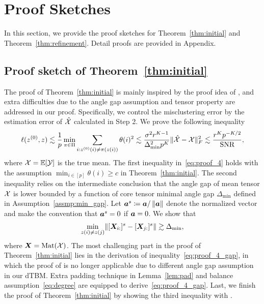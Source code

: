 \documentclass[lettersize,onecolumn,journal]{IEEEtran}
\theoremstyle{definition}
\theoremstyle{definition}
\begin{document}



{
\color{blue}

\section{Proof Sketches}

In this section, we provide the proof sketches for Theorem~\ref{thm:initial} and Theorem~\ref{thm:refinement}. Detail proofs are provided in Appendix.


\subsection{Proof sketch of Theorem~\ref{thm:initial}}
The proof of Theorem~\ref{thm:initial} is mainly inspired by the proof idea of \citet[Lemma 1]{gao2018community}, and extra difficulties due to the angle gap assumption and tensor property are addressed in our proof. Specifically, we control the misclustering error by the estimation error of $\hat {\mathcal{X}}$ calculated in Step 2.  We prove the following inequality
\begin{equation}\label{eq:proof_4}
    \ell(z^{(0)},z) \lesssim \frac{1}{p}\min_{\pi \in \Pi} \sum_{i: z^{(0)}(i) \neq \pi(z(i))} \theta(i)^2 \lesssim \frac{\sigma^2 r^{K-1}}{ \Delta_{\min}^2 p^K} \onormSize{}{\hat \tX - \tX}_F^2 \lesssim \frac{r^K p^{-K/2}}{\text{SNR}},
\end{equation}
where $\mathcal{X} = \mathbb{E}[\mathcal{Y}]$ is the true mean. The first inequality in~\eqref{eq:proof_4} holds with the assumption $\min_{i \in [p]} \theta(i) \geq c$ in Theorem~\ref{thm:initial}. The second inequality relies on the intermediate conclusion that the angle gap of mean tensor $\mathcal{X}$ is lower bounded by a function of core tensor minimal angle gap $\Delta_{\min}$ defined in Assumption~\ref{assmp:min_gap}. Let $\bm{a}^{s} \coloneqq \bm{a}/\left\lVert\bm{a}\right\rVert$ denote the normalized vector and make the convention that $\bm{a}^s = 0$ if $\bm{a} = 0$. We show that
\begin{equation}\label{eq:proof_4_gap}
\min_{z(i) \neq z(j)} \onormSize{}{[\mX_{i:}]^s - [\mX_{j:}]^s} \gtrsim \Delta_{\min},
\end{equation}
where $\bm X = \text{Mat}(\mathcal{X})$. The most challenging part in the proof of Theorem~\ref{thm:initial} lies in the derivation of inequality~\eqref{eq:proof_4_gap}, in which the proof of \cite{gao2018community} is no longer applicable due to different angle gap assumption in our dTBM. Extra padding technique in Lemma~\ref{lem:pad} and balance assumption~\eqref{eq:degree} are equipped to derive~\eqref{eq:proof_4_gap}. Last, we finish the proof of Theorem~\ref{thm:initial} by showing the third inequality with \citet[Proposition 1]{han2020exact}. 


}
\end{document}

